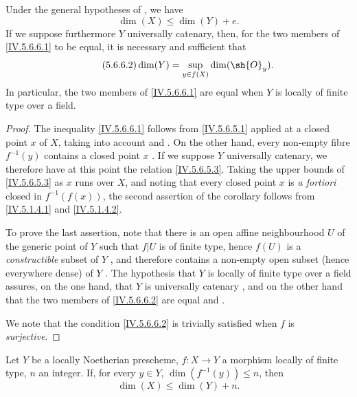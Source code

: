 \begin{corollary}[5.6.6]
\label{IV.5.6.6}
Under the general hypotheses of , we have
\[
\tag{5.6.6.1}\label{IV.5.6.6.1}
  \dim(X) \leq \dim(Y) + e.
\]
If we suppose furthermore $Y$ universally catenary, then, for the two members of \eqref{IV.5.6.6.1} to be equal, it is necessary and sufficient that
\[
\tag{5.6.6.2}\label{IV.5.6.6.2}
  \dim(Y) = \sup_{y\in f(X)} \dim(\sh{O}_y).
\]
In particular, the two members of \eqref{IV.5.6.6.1} are equal when $Y$ is locally of finite type over a field.
\end{corollary}

\begin{proof}
The inequality \eqref{IV.5.6.6.1} follows from \eqref{IV.5.6.5.1} applied at a closed point $x$ of $X$, taking into account  and .
On the other hand, every non-empty fibre $f^{-1}(y)$ contains a closed point $x$ .
If we suppose $Y$ universally catenary, we therefore have at this point the relation \eqref{IV.5.6.5.3}.
Taking the upper bounds of \eqref{IV.5.6.5.3} as $x$ runs over $X$, and noting that every closed point $x$ is \emph{a fortiori} closed in $f^{-1}(f(x))$, the second assertion of the corollary follows from \eqref{IV.5.1.4.1} and \eqref{IV.5.1.4.2}.

To prove the last assertion, note that there is an open affine neighbourhood $U$ of the generic point of $Y$ such that $f|U$ is of finite type, hence $f(U)$ is a \emph{constructible} subset of $Y$ , and therefore contains a non-empty open subset (hence everywhere dense) of $Y$ .
The hypothesis that $Y$ is locally of finite type over a field assures, on the one hand, that $Y$ is universally catenary , and on the other hand that the two members of \eqref{IV.5.6.6.2} are equal  and .

We note that the condition \eqref{IV.5.6.6.2} is trivially satisfied when $f$ is \emph{surjective}.
\end{proof}

\begin{corollary}[5.6.7]
\label{IV.5.6.7}
Let $Y$ be a locally Noetherian prescheme, $f:X\to Y$ a morphism locally of finite type, $n$ an integer.
If, for every $y\in Y$, $\dim(f^{-1}(y))\leq n$, then
\[
\tag{5.6.7.1}\label{IV.5.6.7.1}
  \dim(X) \leq \dim(Y) + n.
\]
\end{corollary}

